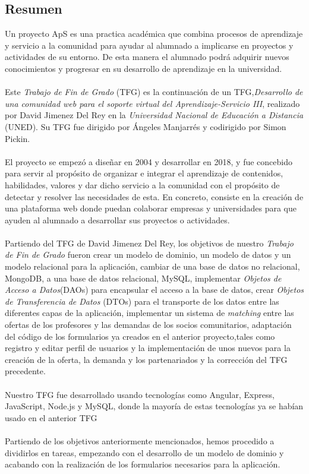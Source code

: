 \documentclass[11pt]{book}
\begin{document}
\begin{itemize}
\chapter*{Resumen} 
Un proyecto ApS es una practica académica que combina procesos de aprendizaje y servicio a la comunidad para ayudar al alumnado a implicarse en proyectos y actividades de su entorno. De esta manera el alumnado podrá adquirir nuevos conocimientos y progresar en su desarrollo de aprendizaje en la universidad.\\\\
Este \textit{Trabajo de Fin de Grado} (TFG) es la continuación de un TFG,\textit{Desarrollo de una comunidad web para el soporte virtual del Aprendizaje-Servicio III}, realizado por David Jimenez Del Rey en la \emph{Universidad Nacional de Educación a Distancia} (UNED). Su TFG fue dirigido por Ángeles Manjarrés y codirigido por Simon Pickin. \\\\
El proyecto se empezó a diseñar en 2004 y desarrollar en 2018, y fue concebido para servir al propósito de organizar e integrar el aprendizaje de contenidos, habilidades, valores y dar dicho servicio a la comunidad con el propósito de detectar y resolver las necesidades de esta.
En concreto, consiste en la creación de una plataforma web donde puedan colaborar empresas y universidades para que ayuden al alumnado a desarrollar sus proyectos o actividades.\\\\
Partiendo del TFG de David Jimenez Del Rey, los objetivos de nuestro \textit{Trabajo de Fin de Grado} fueron crear un modelo de dominio, un modelo de datos y un modelo relacional para la aplicación, cambiar de una base de datos no relacional, MongoDB, a una base de datos relacional, MySQL, implementar \emph{Objetos de Acceso a Datos}(DAOs) para encapsular el acceso a la base de datos, crear \emph{Objetos de Transferencia de Datos} (DTOs) para el transporte de los datos entre las diferentes capas de la aplicación, implementar un sistema de \textit{matching} entre las ofertas de los profesores y las demandas de los socios comunitarios, adaptación del código de los formularios ya creados en el anterior proyecto,tales como registro  y editar perfil de usuarios y la implementación de unos nuevos para la creación  de la oferta, la demanda y los partenariados y la corrección del TFG precedente.\\\\
Nuestro TFG fue desarrollado usando tecnologías como Angular, Express, JavaScript, Node.js y MySQL, donde la mayoría de estas tecnologías ya se habían usado en el anterior TFG\\\\
Partiendo de los objetivos anteriormente mencionados, hemos procedido a dividirlos en tareas, empezando con el desarrollo de un modelo de dominio y acabando con la realización de los formularios necesarios para la aplicación.

\end{itemize}
\end{document}
